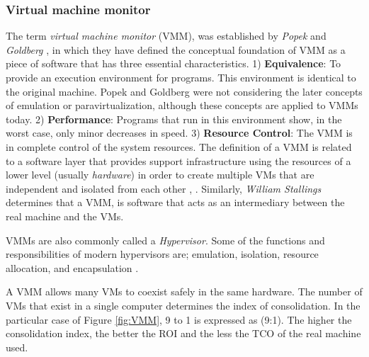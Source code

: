 	\subsubsection{Virtual machine monitor}
	
	The term \textit{virtual machine monitor} (VMM), was established by \textit{Popek} and \textit{Goldberg} \cite{Popek1974}, in which they have defined the conceptual foundation of VMM as a piece of software that has three essential characteristics. 1) \textbf{Equivalence}: To provide an execution environment for programs. This environment is identical to the original machine. Popek and Goldberg were not considering the later concepts of emulation or paravirtualization, although these concepts are applied to VMMs today. 2) \textbf{Performance}: Programs that run in this environment show, in the worst case, only minor decreases in speed. 3) \textbf{Resource Control}: The VMM is in complete control of the system resources. The definition of a VMM is related to a software layer that provides support infrastructure using the resources of a lower level (usually \textit{hardware}) in order to create multiple VMs that are independent and isolated from each other \cite{Chiueh2005}, \cite{Cafaro2011}. Similarly, \textit{William Stallings} \cite{Stallings2015} determines that a VMM, is software that acts as an intermediary between the real machine and the VMs. 
	  
	  VMMs are also commonly called a \textit{Hypervisor}. Some of the functions and responsibilities of modern hypervisors are; emulation, isolation, resource allocation, and encapsulation \cite{Hoopes2009}. 
	  
	  A VMM allows many VMs to coexist safely in the same hardware. The number of VMs that exist in a single computer determines the index of consolidation. In the particular case of Figure \ref{fig:VMM}, 9 to 1 is expressed as (9:1). The higher the consolidation index, the better the ROI and the less the TCO of the real machine used.


